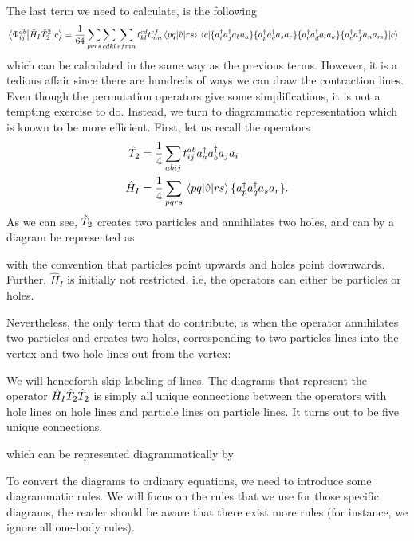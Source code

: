 The last term we need to calculate, is the following
\begin{align}
    \mel{\phiijab}{\hat{H}_I\hatTt^2}{c}&=\frac{1}{64}\sum_{pqrs}\sum_{cdkl}\sum_{efmn}t_{kl}^{cd}t_{mn}^{ef}\brak{pq}{rs}\mel{c}{\{\ad_i\ad_ja_ba_a\}\{\ad_p\ad_qa_sa_r\}\{\ad_c\ad_da_la_k\}\{\ad_e\ad_fa_na_m\}}{c}
\end{align}
which can be calculated in the same way as the previous terms. However, it is a tedious affair since there are hundreds of ways we can draw the contraction lines. Even though the permutation operators give some simplifications, it is not a tempting exercise to do. Instead, we turn to diagrammatic representation which is known to be more efficient. First, let us recall the operators
\begin{align*}
    \hat{T}_2 &= \frac{1}{4}\sum_{abij} t_{ij}^{ab}a^\dagger_a a^\dagger_b a_j a_i \\
    \hat{H}_I &= \frac{1}{4}\sum_{pqrs} \brak{pq}{rs} \{a^\dagger_p a^\dagger_q a_s a_r \}.
\end{align*}
As we can see, $\hat{T}_2$ creates two particles and annihilates two holes, and can by a diagram be represented as

with the convention that particles point upwards and holes point downwards. Further, $\hat{H}_I$ is initially not restricted, i.e, the operators can either be particles or holes. 

Nevertheless, the only term that do contribute, is when the operator annihilates two particles and creates two holes, corresponding to two particles lines into the vertex and two hole lines out from the vertex: 

We will henceforth skip labeling of lines. The diagrams that represent the operator $\hat{H}_I\hat{T}_2\hat{T}_2$ is simply all unique connections between the operators with hole lines on hole lines and particle lines on particle lines. It turns out to be five unique connections,

which can be represented diagrammatically by

To convert the diagrams to ordinary equations, we need to introduce some diagrammatic rules. We will focus on the rules that we use for those specific diagrams, the reader should be aware that there exist more rules (for instance, we ignore all one-body rules).

